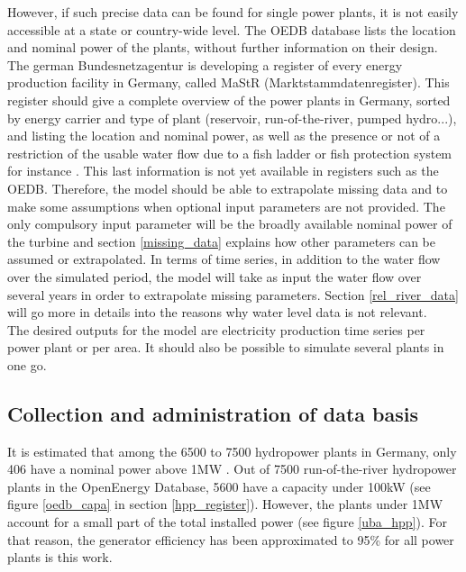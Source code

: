 However, if such precise data can be found for single power plants, it is not easily accessible at a state or country-wide level. The OEDB database lists the location and nominal power of the plants, without further information on their design. The german Bundesnetzagentur is developing a register of every energy production facility in Germany, called MaStR (Marktstammdatenregister). This register should give a complete overview of the power plants in Germany, sorted by energy carrier and type of plant (reservoir, run-of-the-river, pumped hydro...), and listing the location and nominal power, as well as the presence or not of a restriction of the usable water flow due to a fish ladder or fish protection system for instance \cite{MaStR}. This last information is not yet available in registers such as the OEDB.\newline
Therefore, the model should be able to extrapolate missing data and to make some assumptions when optional input parameters are not provided. The only compulsory input parameter will be the broadly available nominal power of the turbine and section \ref{missing_data} explains how other parameters can be assumed or extrapolated. \newline
In terms of time series, in addition to the water flow over the simulated period, the model will take as input the water flow over several years in order to extrapolate missing parameters. Section \ref{rel_river_data} will go more in details into the reasons why water level data is not relevant. \\
The desired outputs for the model are electricity production time series per power plant or per area. It should also be possible to simulate several plants in one go.

\subsection{Collection and administration of data basis}

It is estimated that among the 6500 to 7500 hydropower plants in Germany, only 406 have a nominal power above 1MW \cite{uba_wasserkraft}. Out of 7500 run-of-the-river hydropower plants in the OpenEnergy Database, 5600 have a capacity under 100kW (see figure \ref{oedb_capa} in section \ref{hpp_register}).  However, the plants under 1MW account for a small part of the total installed power (see figure \ref{uba_hpp}). For that reason, the generator efficiency has been approximated to 95\% for all power plants is this work.


